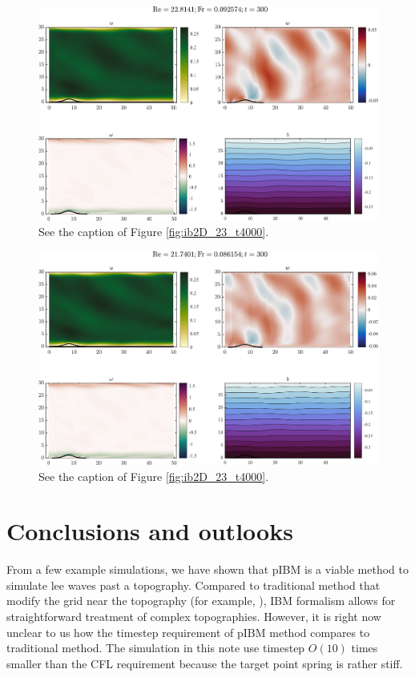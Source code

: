 \documentclass[11pt,letterpaper]{article}
\begin{document}
\begin{figure}
    \centering
    \includegraphics[width=\textwidth]{fig/ib2D_11_t9216}
    \caption{See the caption of Figure \ref{fig:ib2D_23_t4000}.}
    \label{fig:ib2D_11_t9216}
\end{figure}
\begin{figure}
    \centering
    \includegraphics[width=\textwidth]{fig/ib2D_12_t9216}
    \caption{See the caption of Figure \ref{fig:ib2D_23_t4000}.}
    \label{fig:ib2D_12_t9216}
\end{figure}

\section{Conclusions and outlooks}
From a few example simulations, we have shown that pIBM is a viable method to simulate lee waves past a topography. Compared to traditional method that modify the grid near the topography (for example, \cite{AdcroftEtAl_97}), IBM formalism allows for straightforward treatment of complex topographies. However, it is right now unclear to us how the timestep requirement of pIBM method compares to traditional method. The simulation in this note use timestep $O(10)$ times smaller than the CFL requirement because the target point spring is rather stiff. 
\end{document}

